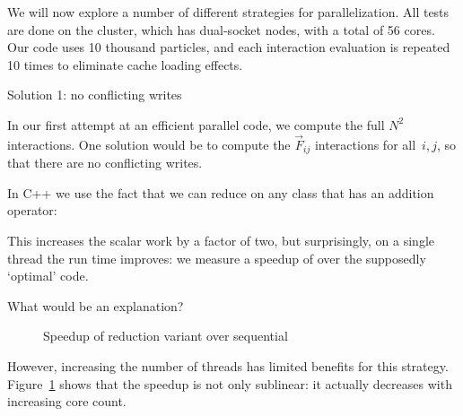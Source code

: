 We will now explore a number of different strategies for parallelization.
All tests are done on the  cluster,
which has dual-socket  nodes,
with a total of 56 cores.
Our code uses 10 thousand particles, and each interaction evaluation
is repeated 10 times to eliminate cache loading effects.

 {Solution 1: no conflicting writes}

In our first attempt at an efficient parallel code,
we compute the full $N^2$ interactions.
One solution would be to compute the $\overrightarrow F_{ij}$
interactions for all~$i,j$,
so that there are no conflicting writes.


In C++ we use the fact that we can reduce on any class
that has an addition operator:
%

This increases the scalar work by a factor of two,
but surprisingly, on a single thread the run time improves:
we measure a speedup of  over the supposedly `optimal' code.

\begin{exercise}
  What would be an explanation?
\end{exercise}


\begin{figure}[t]
  \caption{{Speedup of reduction variant over sequential}}
  \label{fig:omp-nbody1}
\end{figure}

However, increasing the number of threads has limited benefits for this strategy.
Figure~\ref{fig:omp-nbody1} shows that
the speedup is not only sublinear:
it actually decreases with increasing core count.

